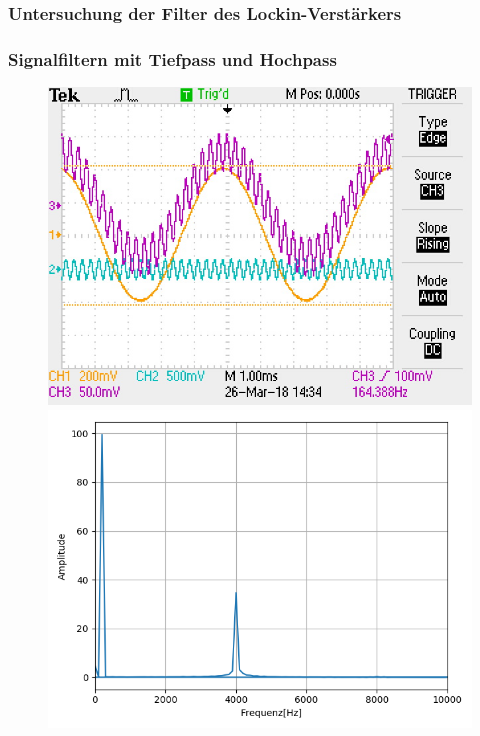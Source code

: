 \documentclass[12pt,a4paper]{article}
\begin{document}
\subsubsection{Untersuchung der Filter des Lockin-Verstärkers}


\subsubsection{Signalfiltern mit Tiefpass und Hochpass}
\begin{figure}
\centering
\includegraphics[scale=0.9]{Bilder/Vorversuch3/F0000TEK.JPG}
\includegraphics[scale=0.5]{Bilder/Vorversuch3/Vor3_0.png}

\end{figure}
\end{document}
